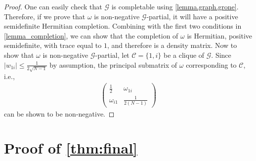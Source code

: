\begin{proof}
    One can easily check that $\mathcal{G}$ is completable using \cref{lemma.graph.grone}. Therefore, if we prove that $\omega$ is non-negative $\mathcal{G}$-partial, it will have a positive semidefinite Hermitian  completion. Combining with the first two conditions in \cref{lemma_completion}, we can show that the completion of $\omega$ is Hermitian, positive semidefinite, with trace equal to $1$, and therefore is a density matrix.
    Now to show that $\omega$ is non-negative $\mathcal{G}$-partial, let $\mathcal C=\{1,i\}$ be a clique of $\mathcal G$. Since $|w_{1i}|\leq\frac1{2\sqrt{N-1}}$ by assumption, the principal submatrix of $\omega$ corresponding to $\mathcal C$, i.e.,
    \begin{align}
        \begin{pmatrix}
            \frac{1}{2} & \omega_{1i}\\
            \omega_{i1} & \frac{1}{2(N-1)}
        \end{pmatrix}
    \end{align}
    can be shown to be non-negative.
\end{proof}


\section{Proof of \cref{thm:final}}\label{pf:final}

